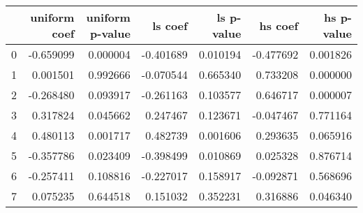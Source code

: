 \begin{tabular}{lrrrrrr}
\toprule
 & uniform coef & uniform p-value & ls coef & ls p-value & hs coef & hs p-value \\
\midrule
0 & -0.659099 & 0.000004 & -0.401689 & 0.010194 & -0.477692 & 0.001826 \\
1 & 0.001501 & 0.992666 & -0.070544 & 0.665340 & 0.733208 & 0.000000 \\
2 & -0.268480 & 0.093917 & -0.261163 & 0.103577 & 0.646717 & 0.000007 \\
3 & 0.317824 & 0.045662 & 0.247467 & 0.123671 & -0.047467 & 0.771164 \\
4 & 0.480113 & 0.001717 & 0.482739 & 0.001606 & 0.293635 & 0.065916 \\
5 & -0.357786 & 0.023409 & -0.398499 & 0.010869 & 0.025328 & 0.876714 \\
6 & -0.257411 & 0.108816 & -0.227017 & 0.158917 & -0.092871 & 0.568696 \\
7 & 0.075235 & 0.644518 & 0.151032 & 0.352231 & 0.316886 & 0.046340 \\
\bottomrule
\end{tabular}
